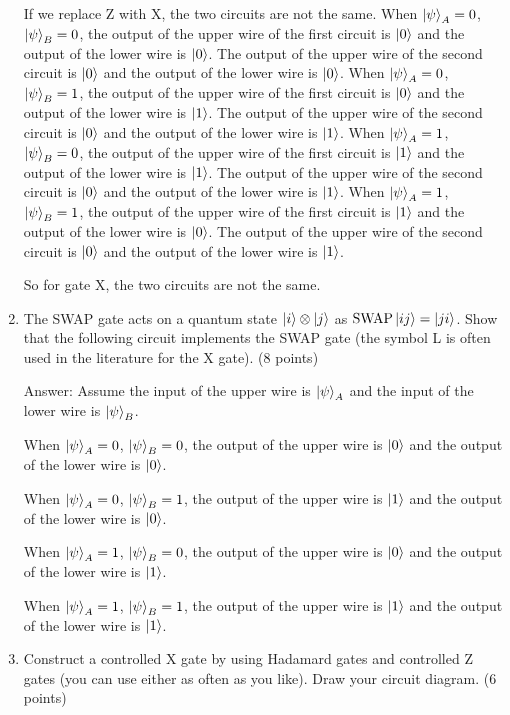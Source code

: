 \documentclass{article}
\begin{document}
\begin{enumerate}
          If we replace Z with X, the two circuits are not the same.
          When $\ket{\psi}_A=0$, $\ket{\psi}_B=0$, the output of the upper wire of the first circuit is $\ket{0}$ and the output of the lower wire is $\ket{0}$. The output of the upper wire of the second circuit is $\ket{0}$ and the output of the lower wire is $\ket{0}$.
          When $\ket{\psi}_A=0$, $\ket{\psi}_B=1$, the output of the upper wire of the first circuit is $\ket{0}$ and the output of the lower wire is $\ket{1}$. The output of the upper wire of the second circuit is $\ket{0}$ and the output of the lower wire is $\ket{1}$.
          When $\ket{\psi}_A=1$, $\ket{\psi}_B=0$, the output of the upper wire of the first circuit is $\ket{1}$ and the output of the lower wire is $\ket{1}$. The output of the upper wire of the second circuit is $\ket{0}$ and the output of the lower wire is $\ket{1}$.
          When $\ket{\psi}_A=1$, $\ket{\psi}_B=1$, the output of the upper wire of the first circuit is $\ket{1}$ and the output of the lower wire is $\ket{0}$. The output of the upper wire of the second circuit is $\ket{0}$ and the output of the lower wire is $\ket{1}$.

          So for gate X, the two circuits are not the same.

    \item The SWAP gate acts on a quantum state $\ket{i} \otimes \ket{j}$ as $\text{SWAP} \ket{ij} = \ket{ji}$. Show that the following circuit implements the SWAP gate (the symbol L is often used in the literature for the X gate). (8 points)

          Answer: Assume the input of the upper wire is $\ket{\psi}_A$ and the input of the lower wire is $\ket{\psi}_B$.

          When $\ket{\psi}_A=0$, $\ket{\psi}_B=0$, the output of the upper wire is $\ket{0}$ and the output of the lower wire is $\ket{0}$.

          When $\ket{\psi}_A=0$, $\ket{\psi}_B=1$, the output of the upper wire is $\ket{1}$ and the output of the lower wire is $\ket{0}$.

          When $\ket{\psi}_A=1$, $\ket{\psi}_B=0$, the output of the upper wire is $\ket{0}$ and the output of the lower wire is $\ket{1}$.

          When $\ket{\psi}_A=1$, $\ket{\psi}_B=1$, the output of the upper wire is $\ket{1}$ and the output of the lower wire is $\ket{1}$.



    \item Construct a controlled X gate by using Hadamard gates and controlled Z gates (you can use either as often as you like). Draw your circuit diagram. (6 points)



\end{enumerate}
\end{document}
